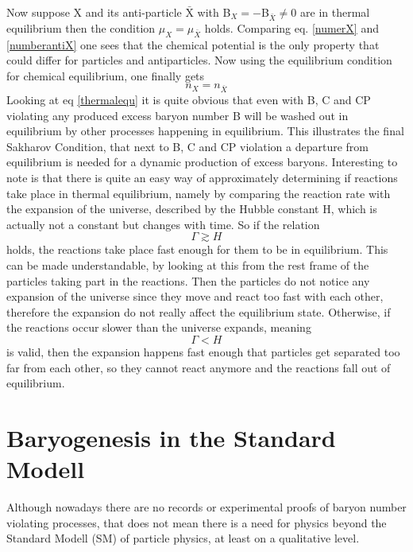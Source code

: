 Now suppose X and its anti-particle $\bar{\text{X}}$  with B$_X=-$B$_{\bar{X}}\neq0$ are in thermal equilibrium then the condition $\mu_X=\mu_{\bar{X}}$ holds. Comparing eq. \ref{numerX} and \ref{numberantiX} one sees that the chemical potential is the only property that could differ for particles and antiparticles. Now using the equilibrium condition for chemical equilibrium, one finally gets
\begin{equation}
	n_X=n_{\bar{X}}
	\label{thermalequ}
\end{equation}
Looking at eq \ref{thermalequ} it is quite obvious that even with B, C and CP violating any produced excess baryon number B will be washed out in equilibrium by other processes happening in equilibrium. \newline
This illustrates the final Sakharov Condition, that next to B, C and CP violation a departure from equilibrium is needed for a dynamic production of excess baryons. \newline
Interesting to note is that there is quite an easy way of approximately determining if reactions take place in thermal equilibrium, namely by comparing the reaction rate with the expansion of the universe, described by the Hubble constant H, which is actually not a constant but changes with time. So if the relation 
\begin{equation}
	\Gamma\gtrsim H
	\label{eq:rate_g_hubble}
\end{equation}
holds, the reactions take place fast enough for them to be in equilibrium. This can be made understandable, by looking at this from the rest frame of the particles taking part in the reactions. Then the particles do not notice any expansion of the universe since they move and react too fast with each other, therefore the expansion do not really affect the equilibrium state. \newline
Otherwise, if the reactions occur slower than the universe expands, meaning
\begin{equation}
	\Gamma<H
	\label{eq:rate_s_hubble}
\end{equation}
is valid, then the expansion happens fast enough that particles get separated too far from each other, so they cannot react anymore and the reactions fall out of equilibrium.
\section{Baryogenesis in the Standard Modell}
Although nowadays there are no records or experimental proofs of baryon number violating processes, that does not mean there is a need for physics beyond the Standard Modell (SM) of particle physics, at least on a qualitative level.
